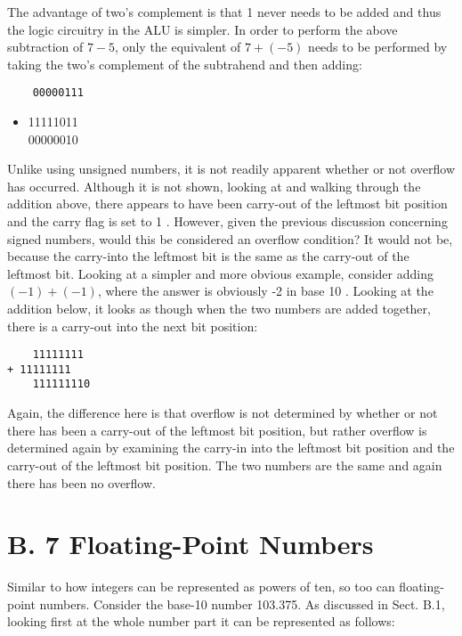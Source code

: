 \documentclass[10pt]{article}
\begin{document}
The advantage of two's complement is that 1 never needs to be added and thus the logic circuitry in the ALU is simpler. In order to perform the above subtraction of $7-5$, only the equivalent of $7+(-5)$ needs to be performed by taking the two's complement of the subtrahend and then adding:

\begin{verbatim}
    00000111
\end{verbatim}

\begin{itemize}
  \item 11111011\\
00000010
\end{itemize}

Unlike using unsigned numbers, it is not readily apparent whether or not overflow has occurred. Although it is not shown, looking at and walking through the addition above, there appears to have been carry-out of the leftmost bit position and the carry flag is set to 1 . However, given the previous discussion concerning signed numbers, would this be considered an overflow condition? It would not be, because the carry-into the leftmost bit is the same as the carry-out of the leftmost bit. Looking at a simpler and more obvious example, consider adding $(-1)+(-1)$, where the answer is obviously -2 in base 10 . Looking at the addition below, it looks as though when the two numbers are added together, there is a carry-out into the next bit position:

\begin{verbatim}
    11111111
+ 11111111
    111111110
\end{verbatim}

Again, the difference here is that overflow is not determined by whether or not there has been a carry-out of the leftmost bit position, but rather overflow is determined again by examining the carry-in into the leftmost bit position and the carry-out of the leftmost bit position. The two numbers are the same and again there has been no overflow.

\section*{B. 7 Floating-Point Numbers}
Similar to how integers can be represented as powers of ten, so too can floating-point numbers. Consider the base-10 number 103.375. As discussed in Sect. B.1, looking first at the whole number part it can be represented as follows:
\end{document}
